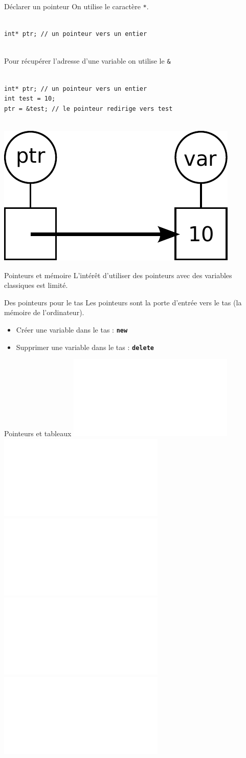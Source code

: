 \begin{frame}[fragile=singleslide]{Déclarer un pointeur}
    On utilise le caractère \texttt{*}.
    \begin{verbatim}
        
int* ptr; // un pointeur vers un entier
        
    \end{verbatim}
    Pour récupérer l'adresse d'une variable on utilise le \texttt{\&}
    \begin{verbatim}
        
int* ptr; // un pointeur vers un entier
int test = 10;
ptr = &test; // le pointeur redirige vers test
        
    \end{verbatim}
    \begin{center}
        \includegraphics[width=0.27\linewidth]{images/ptr.pdf}
    \end{center}
\end{frame}

\begin{frame}{Pointeurs et mémoire}
    L'intérêt d'utiliser des pointeurs avec des variables classiques est limité.

    \begin{block}{Des pointeurs pour le tas}
        Les pointeurs sont la porte d'entrée vers le tas (la mémoire de l'ordinateur).
    \end{block}
    \begin{itemize}
        \item Créer une variable dans le tas : \textbf{\texttt{new}}
        \item Supprimer une variable dans le tas : \textbf{\texttt{delete}}
    \end{itemize}
\end{frame}

\begin{frame}{Pointeurs et tableaux}
\centering
\includegraphics<1>[width=\linewidth]{images/tableaux_tas_01.pdf}
\includegraphics<2>[width=\linewidth]{images/tableaux_tas_02.pdf}
\includegraphics<3>[width=\linewidth]{images/tableaux_tas_03.pdf}
\includegraphics<4>[width=\linewidth]{images/tableaux_tas_04.pdf}
\includegraphics<5>[width=\linewidth]{images/tableaux_tas_05.pdf}
\end{frame}

